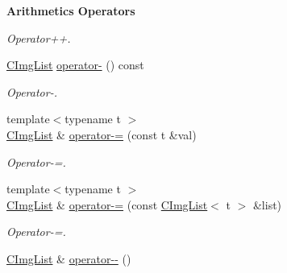 \begin{Indent}{\bf Arithmetics Operators}
\begin{DoxyCompactItemize}
\begin{DoxyCompactList}\small\item\em Operator++. \item\end{DoxyCompactList}\item 
\hypertarget{structcimg__library_1_1_c_img_list_a5b7efc7ecf0d44cad71662a9888b8222}{
\hyperlink{structcimg__library_1_1_c_img_list}{CImgList} \hyperlink{structcimg__library_1_1_c_img_list_a5b7efc7ecf0d44cad71662a9888b8222}{operator-\/} () const }
\label{structcimg__library_1_1_c_img_list_a5b7efc7ecf0d44cad71662a9888b8222}

\begin{DoxyCompactList}\small\item\em Operator-\/. \item\end{DoxyCompactList}\item 
\hypertarget{structcimg__library_1_1_c_img_list_ae2b9e91f1c2a90c34450999d0e155d4c}{
{\footnotesize template$<$typename t $>$ }\\\hyperlink{structcimg__library_1_1_c_img_list}{CImgList} \& \hyperlink{structcimg__library_1_1_c_img_list_ae2b9e91f1c2a90c34450999d0e155d4c}{operator-\/=} (const t \&val)}
\label{structcimg__library_1_1_c_img_list_ae2b9e91f1c2a90c34450999d0e155d4c}

\begin{DoxyCompactList}\small\item\em Operator-\/=. \item\end{DoxyCompactList}\item 
\hypertarget{structcimg__library_1_1_c_img_list_a3406b6ef148f06ad1434385e01b5386f}{
{\footnotesize template$<$typename t $>$ }\\\hyperlink{structcimg__library_1_1_c_img_list}{CImgList} \& \hyperlink{structcimg__library_1_1_c_img_list_a3406b6ef148f06ad1434385e01b5386f}{operator-\/=} (const \hyperlink{structcimg__library_1_1_c_img_list}{CImgList}$<$ t $>$ \&list)}
\label{structcimg__library_1_1_c_img_list_a3406b6ef148f06ad1434385e01b5386f}

\begin{DoxyCompactList}\small\item\em Operator-\/=. \item\end{DoxyCompactList}\item 
\hypertarget{structcimg__library_1_1_c_img_list_a34a911b24c2b48df34c15042dfa2afd1}{
\hyperlink{structcimg__library_1_1_c_img_list}{CImgList} \& \hyperlink{structcimg__library_1_1_c_img_list_a34a911b24c2b48df34c15042dfa2afd1}{operator-\/-\/} ()}
\label{structcimg__library_1_1_c_img_list_a34a911b24c2b48df34c15042dfa2afd1}


\end{DoxyCompactItemize}
\end{Indent}
